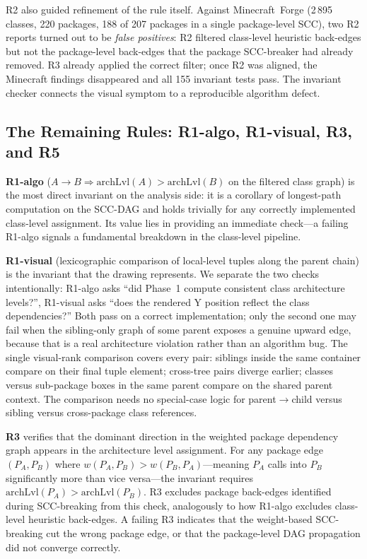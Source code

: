 \documentclass[a4paper,twoside]{article}
\begin{document}
R2 also guided refinement of the rule itself.
Against Minecraft~Forge (2\,895 classes, 220 packages, 188 of 207 packages
in a single package-level SCC), two R2 reports turned out to be
\emph{false positives}: R2 filtered class-level heuristic back-edges but not
the package-level back-edges that the package SCC-breaker had already removed.
R3 already applied the correct filter; once R2 was aligned, the Minecraft
findings disappeared and all 155 invariant tests pass.
The invariant checker connects the visual symptom to a reproducible algorithm defect.

\subsection*{The Remaining Rules: R1-algo, R1-visual, R3, and R5}

\textbf{R1-algo} ($A \rightarrow B \Rightarrow \text{archLvl}(A) > \text{archLvl}(B)$ on
the filtered class graph) is the most direct invariant on the analysis side: it is a
corollary of longest-path computation on the SCC-DAG and holds trivially for any
correctly implemented class-level assignment. Its value lies in providing an
immediate check---a failing R1-algo signals a fundamental breakdown in
the class-level pipeline.

\textbf{R1-visual} (lexicographic comparison of local-level tuples along
the parent chain) is the invariant that the
drawing represents. We separate the two checks intentionally: R1-algo asks ``did Phase~1
compute consistent class architecture levels?'', R1-visual asks ``does the
rendered Y position reflect the class dependencies?'' Both pass on a
correct implementation; only the second one may fail when the
sibling-only graph of some parent exposes a genuine upward edge, because
that is a real architecture violation rather than an algorithm bug. The
single visual-rank comparison covers every pair: siblings inside the same
container compare on their final tuple element; cross-tree pairs diverge
earlier; classes versus sub-package boxes in the same parent compare on the
shared parent context. The comparison needs no special-case logic for parent$\to$child
versus sibling versus cross-package class references.

\textbf{R3} verifies that the dominant direction in the weighted package dependency graph
appears in the architecture level assignment. For any package edge $(P_A, P_B)$ where
$w(P_A,P_B) > w(P_B,P_A)$---meaning $P_A$ calls into $P_B$ significantly more than
vice versa---the invariant requires $\text{archLvl}(P_A) > \text{archLvl}(P_B)$.
R3 excludes package back-edges identified during SCC-breaking from this check,
analogously to how R1-algo excludes class-level heuristic back-edges.
A failing R3 indicates that the weight-based SCC-breaking cut the wrong package
edge, or that the package-level DAG propagation did not converge correctly.
\end{document}
